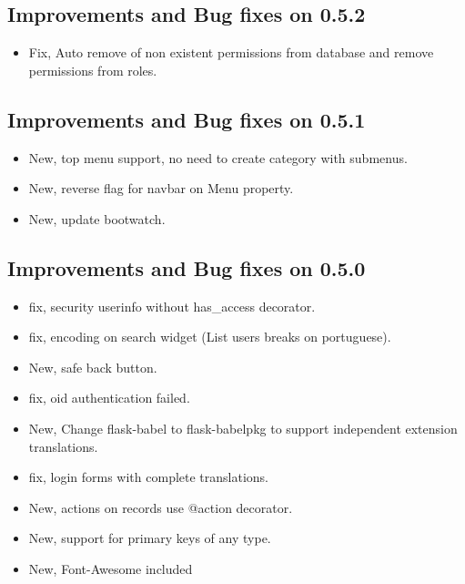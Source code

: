 \documentclass[letterpaper,10pt,english]{sphinxmanual}
\begin{document}
\subsection{Improvements and Bug fixes on 0.5.2}
\label{versions:improvements-and-bug-fixes-on-0-5-2}\begin{itemize}
\item {} 
Fix, Auto remove of non existent permissions from database and remove permissions from roles.

\end{itemize}


\subsection{Improvements and Bug fixes on 0.5.1}
\label{versions:improvements-and-bug-fixes-on-0-5-1}\begin{itemize}
\item {} 
New, top menu support, no need to create category with submenus.

\item {} 
New, reverse flag for navbar on Menu property.

\item {} 
New, update bootwatch.

\end{itemize}


\subsection{Improvements and Bug fixes on 0.5.0}
\label{versions:improvements-and-bug-fixes-on-0-5-0}\begin{itemize}
\item {} 
fix, security userinfo without has\_access decorator.

\item {} 
fix, encoding on search widget (List users breaks on portuguese).

\item {} 
New, safe back button.

\item {} 
fix, oid authentication failed.

\item {} 
New, Change flask-babel to flask-babelpkg to support independent extension translations.

\item {} 
fix, login forms with complete translations.

\item {} 
New, actions on records use @action decorator.

\item {} 
New, support for primary keys of any type.

\item {} 
New, Font-Awesome included

\end{itemize}
\end{document}

